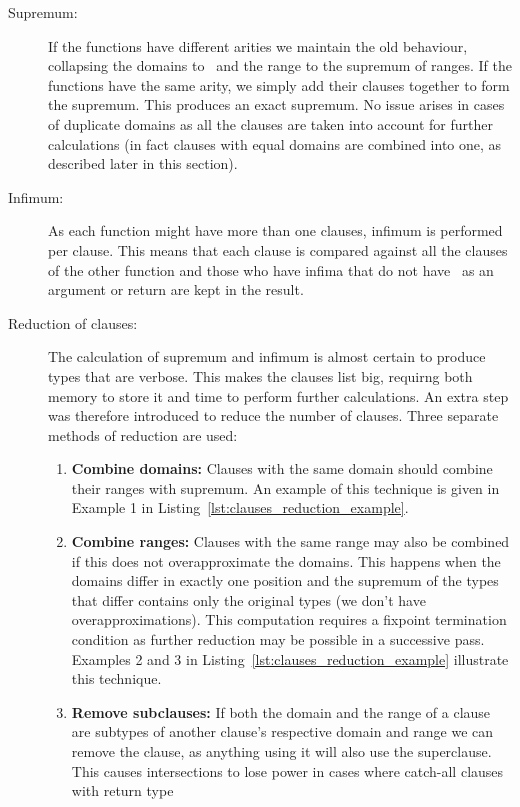 \begin{description}
\item[Supremum:] If the functions have different arities we maintain
  the old behaviour, collapsing the domains to \any\ and the range to
  the supremum of ranges. If the functions have the same arity, we
  simply add their clauses together to form the supremum. This
  produces an exact supremum. No issue arises in cases of duplicate
  domains as all the clauses are taken into account for further
  calculations (in fact clauses with equal domains are combined into
  one, as described later in this section).
\item[Infimum:] As each function might have more than one clauses,
  infimum is performed per clause. This means that each clause is
  compared against all the clauses of the other function and those who
  have infima that do not have \none\ as an argument or return are
  kept in the result.
\item[Reduction of clauses:] The calculation of supremum and infimum
  is almost certain to produce types that are verbose. This makes the
  clauses list big, requirng both memory to store it and time to
  perform further calculations. An extra step was therefore introduced
  to reduce the number of clauses. Three separate methods of reduction
  are used:
  \begin{enumerate}
    \item \textbf{Combine domains:} Clauses with the same domain
      should combine their ranges with supremum. An example of this
      technique is given in Example 1 in
      Listing~\ref{lst:clauses_reduction_example}.
    \item \textbf{Combine ranges:} Clauses with the same range may
      also be combined if this does not overapproximate the
      domains. This happens when the domains differ in exactly one
      position and the supremum of the types that differ contains only
      the original types (we don't have overapproximations). This
      computation requires a fixpoint termination condition as further
      reduction may be possible in a successive pass. Examples 2 and 3
      in Listing~\ref{lst:clauses_reduction_example} illustrate
      this technique.
    \item \textbf{Remove subclauses:} If both the domain and the range
      of a clause are subtypes of another clause's respective domain
      and range we can remove the clause, as anything using it will
      also use the superclause. This causes intersections to lose
      power in cases where catch-all clauses with return type

\end{enumerate}
\end{description}
